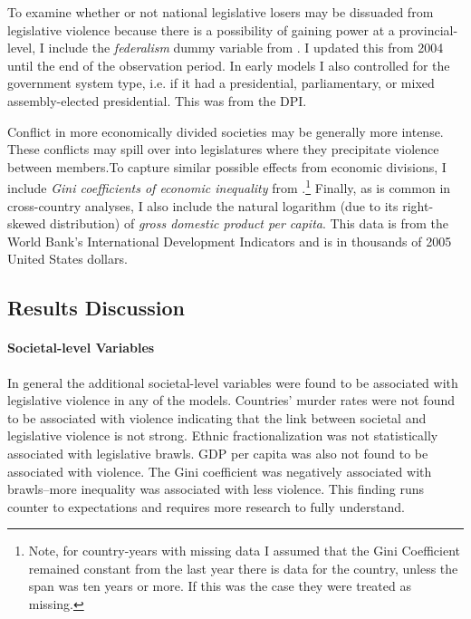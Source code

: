 \documentclass[a4paper]{article}\usepackage[]{graphicx}\usepackage[]{color}
\begin{document}
To examine whether or not national legislative losers may be dissuaded from legislative violence because there is a possibility of gaining power at a provincial-level, I include the \emph{federalism} dummy variable from \cite{Carey2011}. I updated this from 2004 until the end of the observation period. In early models I also controlled for the government system type, i.e. if it had a presidential, parliamentary, or mixed assembly-elected presidential. This was from the DPI.

Conflict in more economically divided societies may be generally more intense. These conflicts may spill over into legislatures where they precipitate violence between members.To capture similar possible effects from economic divisions, I include {\emph{Gini coefficients of economic inequality}} from \cite{UNU2008}.\footnote{Note, for country-years with missing data I assumed that the Gini Coefficient remained constant from the last year there is data for the country, unless the span was ten years or more. If this was the case they were treated as missing.} Finally, as is common in cross-country analyses, I also include the natural logarithm (due to its right-skewed distribution) of {\emph{gross domestic product per capita}}. This data is from the World Bank's International Development Indicators \citeyearpar{WorldBank2011} and is in thousands of 2005 United States dollars.

\subsection*{Results Discussion}


\paragraph{Societal-level Variables}

In general the additional societal-level variables were found to be associated with legislative violence in any of the models. Countries' murder rates were not found to be associated with violence indicating that the link between societal and legislative violence is not strong. Ethnic fractionalization was not statistically associated with legislative brawls. GDP per capita was also not found to be associated with violence. The Gini coefficient was negatively associated with brawls--more inequality was associated with less violence. This finding runs counter to expectations and requires more research to fully understand.
\end{document}
